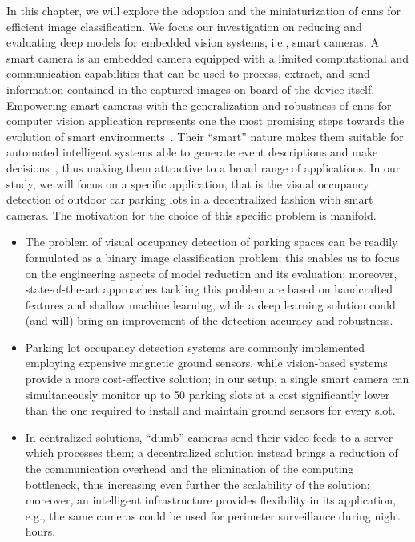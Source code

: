 In this chapter, we will explore the adoption and the miniaturization of \glspl{cnn} for efficient image classification.
We focus our investigation on reducing and evaluating deep models for embedded vision systems, i.e., smart cameras.
A smart camera is an embedded camera equipped with a limited computational and communication capabilities that can be used to process, extract, and send information contained in the captured images on board of the device itself.
Empowering smart cameras with the generalization and robustness of \glspl{cnn} for computer vision application represents one the most promising steps towards the evolution of smart environments~\cite{valera2005intelligent}.
Their ``smart'' nature makes them suitable for automated intelligent systems able to generate event descriptions and make decisions~\cite{belbachir2010smart}, thus making them attractive to a broad range of applications.
In our study, we will focus on a specific application, that is the visual occupancy detection of outdoor car parking lots in a decentralized fashion with smart cameras.
The motivation for the choice of this specific problem is manifold.
\begin{itemize}
    \item The problem of visual occupancy detection of parking spaces can be readily formulated as a binary image classification problem;
    this enables us to focus on the engineering aspects of model reduction and its evaluation;
    moreover, state-of-the-art approaches tackling this problem are based on handcrafted features and shallow machine learning, while a deep learning solution could (and will) bring an improvement of the detection accuracy and robustness.

    \item Parking lot occupancy detection systems are commonly implemented employing expensive magnetic ground sensors, while vision-based systems provide a more cost-effective solution;
    in our setup, a single smart camera can simultaneously monitor up to 50 parking slots at a cost significantly lower than the one required to install and maintain ground sensors for every slot.

    \item In centralized solutions, ``dumb'' cameras send their video feeds to a server which processes them;
    a decentralized solution instead brings a reduction of the communication overhead and the elimination of the computing bottleneck, thus increasing even further the scalability of the solution;
    moreover, an intelligent infrastructure provides flexibility in its application, e.g., the same cameras could be used for perimeter surveillance during night hours.

\end{itemize}
